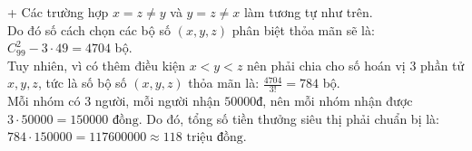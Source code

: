 \begin{ex}
{		+ Các trường hợp $x = z \ne y$ và $y = z \ne x$ làm tương tự như trên.\\
		Do đó số cách chọn các bộ số $(x, y, z)$ phân biệt thỏa mãn sẽ là: $C_{99}^2 - 3 \cdot 49 = 4704$ bộ.\\
		Tuy nhiên, vì có thêm điều kiện $x < y < z$ nên phải chia cho số hoán vị 3 phần tử $x, y, z$, tức là số bộ số $(x, y, z)$ thỏa mãn là: $\displaystyle \frac{4704}{3!} = 784$ bộ.\\
		Mỗi nhóm có 3 người, mỗi người nhận $50000\text{đ}$, nên mỗi nhóm nhận được $3 \cdot 50000 = 150000\text{ đồng}$. Do đó, tổng số tiền thưởng siêu thị phải chuẩn bị là:\\
		$784 \cdot 150000 = 117600000 \approx 118\text{ triệu đồng}$.
	}
\end{ex}











